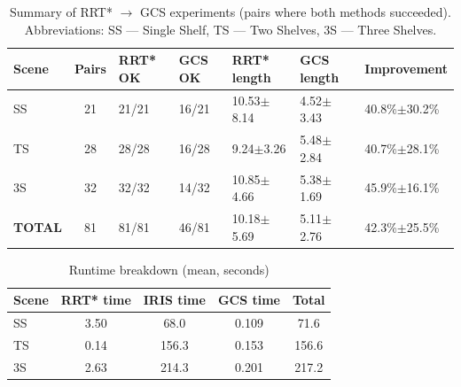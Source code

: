 \documentclass[a4paper]{article}
\begin{document}
\begin{table}[H]
\centering
\caption{Summary of RRT* $\rightarrow$ GCS experiments (pairs where both methods succeeded). Abbreviations: SS --- Single Shelf, TS --- Two Shelves, 3S --- Three Shelves.}
\label{tab:rrt_gcs_results_summary}
\begin{tabular}{l
                S[table-format=2.0]
                l
                l
                l
                l
                l}
\toprule
\textbf{Scene} & \textbf{Pairs} & \textbf{RRT* OK} & \textbf{GCS OK} & \textbf{RRT* length} & \textbf{GCS length} & \textbf{Improvement} \\
\midrule
SS & 21 & 21/21 & 16/21 & 10.53$\pm$8.14 & 4.52$\pm$3.43 & 40.8\%$\pm$30.2\% \\
TS & 28 & 28/28 & 16/28 & 9.24$\pm$3.26  & 5.48$\pm$2.84 & 40.7\%$\pm$28.1\% \\
3S & 32 & 32/32 & 14/32 & 10.85$\pm$4.66 & 5.38$\pm$1.69 & 45.9\%$\pm$16.1\% \\
\midrule
\textbf{TOTAL} & 81 & 81/81 & 46/81 & 10.18$\pm$5.69 & 5.11$\pm$2.76 & 42.3\%$\pm$25.5\% \\
\bottomrule
\end{tabular}
\end{table}

\begin{table}[H]
\centering
\caption{Runtime breakdown (mean, seconds)}
\label{tab:rrt_gcs_times_summary}
\begin{tabular}{l
                S[table-format=1.2]
                S[table-format=3.1]
                S[table-format=1.3]
                S[table-format=3.1]}
\toprule
\textbf{Scene} & \textbf{RRT* time} & \textbf{IRIS time} & \textbf{GCS time} & \textbf{Total} \\
\midrule
SS & 3.50 & 68.0  & 0.109 & 71.6 \\
TS & 0.14 & 156.3 & 0.153 & 156.6 \\
3S & 2.63 & 214.3 & 0.201 & 217.2 \\
\bottomrule
\end{tabular}
\end{table}
\end{document}
